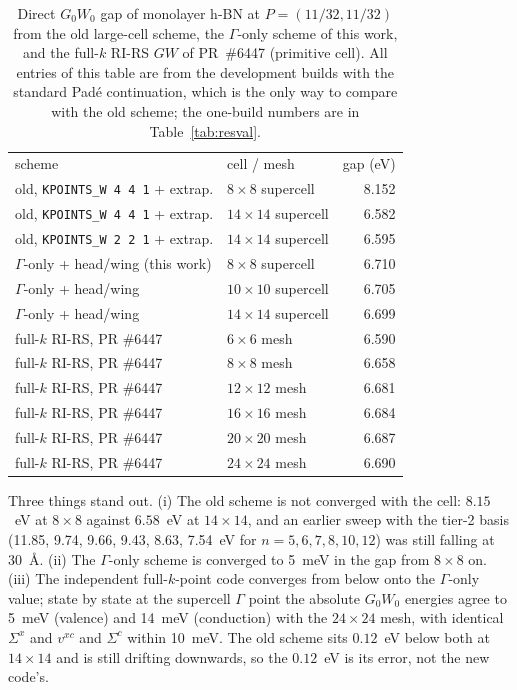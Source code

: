 \documentclass[%
 reprint,
superscriptaddress,
 amsmath,amssymb,
 aps,
prb,
]{revtex4-2}
\begin{document}
\begin{table}[h]
\caption{Direct $G_0W_0$ gap of monolayer h-BN at $P=(11/32,11/32)$ from the old large-cell
scheme, the $\Gamma$-only scheme of this work, and the full-$k$ RI-RS $GW$ of
PR~\#6447 (primitive cell). All entries of this table are from the development builds with
the standard Pad\'e continuation, which is the only way to compare with the old scheme; the
one-build numbers are in Table~\ref{tab:resval}.}
\label{tab:oldscheme}
\begin{ruledtabular}
\begin{tabular}{llr}
scheme & cell / mesh & gap (eV)\\
\colrule
old, \texttt{KPOINTS\_W 4 4 1} + extrap. & $8\times8$ supercell & 8.152\\
old, \texttt{KPOINTS\_W 4 4 1} + extrap. & $14\times14$ supercell & 6.582\\
old, \texttt{KPOINTS\_W 2 2 1} + extrap. & $14\times14$ supercell & 6.595\\
\colrule
$\Gamma$-only + head/wing (this work) & $8\times8$ supercell & 6.710\\
$\Gamma$-only + head/wing & $10\times10$ supercell & 6.705\\
$\Gamma$-only + head/wing & $14\times14$ supercell & 6.699\\
\colrule
full-$k$ RI-RS, PR \#6447 & $6\times6$ mesh & 6.590\\
full-$k$ RI-RS, PR \#6447 & $8\times8$ mesh & 6.658\\
full-$k$ RI-RS, PR \#6447 & $12\times12$ mesh & 6.681\\
full-$k$ RI-RS, PR \#6447 & $16\times16$ mesh & 6.684\\
full-$k$ RI-RS, PR \#6447 & $20\times20$ mesh & 6.687\\
full-$k$ RI-RS, PR \#6447 & $24\times24$ mesh & 6.690\\
\end{tabular}
\end{ruledtabular}
\end{table}

Three things stand out. (i) The old scheme is not converged with the cell: $8.15$~eV at
$8\times8$ against $6.58$~eV at $14\times14$, and an earlier sweep with the tier-2 basis
(11.85, 9.74, 9.66, 9.43, 8.63, 7.54~eV for $n = 5, 6, 7, 8, 10, 12$) was still falling at
30~\AA. (ii) The $\Gamma$-only scheme is converged to 5~meV in the gap from $8\times8$ on.
(iii) The independent full-$k$-point code converges from below onto the $\Gamma$-only value;
state by state at the supercell $\Gamma$ point the absolute $G_0W_0$ energies agree to 5~meV
(valence) and 14~meV (conduction) with the $24\times24$ mesh, with identical $\Sigma^x$ and
$v^{xc}$ and $\Sigma^c$ within 10~meV. The old scheme sits $0.12$~eV below both at
$14\times14$ and is still drifting downwards, so the $0.12$~eV is its error, not the new
code's.
\end{document}
